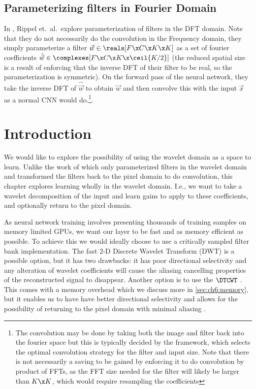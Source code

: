 \subsection{Parameterizing filters in Fourier Domain}
In  \cite{rippel_spectral_2015}, Rippel et.\
al.\ explore parameterization of filters in the DFT domain.  Note that they do
not necessarily do the convolution in the Frequency
domain, they simply parameterize a filter $\vec{w} \in \reals[F\x C\x K\x K]$ as
a set of fourier coefficients $\hat{\vec{w}} \in \complexes[F\x C\x K \x \ceil{K/2}]$
(the reduced spatial size is a result of enforcing that the inverse DFT of their
filter to be real, so the parameterization is symmetric). On the forward pass of
the neural network, they take the inverse DFT of $\hat{\vec{w}}$ to obtain
$\vec{w}$ and then convolve this with the input $\vec{x}$ as a normal CNN
would do.\footnote{The convolution may be done by taking both the image and
filter back into the fourier space but this is typically decided by the
framework, which selects the optimal convolution strategy for the filter and
input size. Note that there is not necessarily a saving to be gained by
enforcing it to do convolution by product of FFTs, as the FFT size needed for
the filter will likely be larger than $K\x K$, which would require resampling
the coefficients}. 

\section{Introduction}

We would like to explore the possibility of using the wavelet domain as a
space to learn. Unlike the work of \cite{rippel_spectral_2015} which
only parameterized filters in the wavelet domain and transformed the filters
back to the pixel domain to do convolution, this chapter explores learning
wholly in the wavelet domain. I.e., we want to take a wavelet decomposition of
the input and learn gains to apply to these coefficients, and optionally return
to the pixel domain.

As neural network training involves presenting thousands of training samples on
memory limited GPUs, we want our layer to be fast and as memory efficient as
possible. To achieve this we would ideally choose to use a critically sampled
filter bank implementation.  The fast 2-D Discrete Wavelet Transform (DWT) is a
possible option, but it has two drawbacks: it has poor directional selectivity
and any alteration of wavelet coefficients will cause the aliasing cancelling
properties of the reconstructed signal to disappear. Another option is to use
the $\DTCWT$ \cite{selesnick_dual-tree_2005}. This comes with a memory overhead
which we discuss more in \autoref{sec:ch6:memory}, but it enables us to have
have better directional selectivity and allows for the possibility of returning
to the pixel domain with minimal aliasing \cite{kingsbury_complex_2001}.

